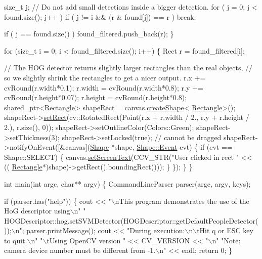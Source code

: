 \begin{DoxyCode}
        \textcolor{keywordtype}{size\_t} j;
        \textcolor{comment}{// Do not add small detections inside a bigger detection.}
        \textcolor{keywordflow}{for} ( j = 0; j < found.size(); j++ )
            \textcolor{keywordflow}{if} ( j != i && (r & found[j]) == r )
                \textcolor{keywordflow}{break};

        \textcolor{keywordflow}{if} ( j == found.size() )
            found\_filtered.push\_back(r);
    \}

    \textcolor{keywordflow}{for} (\textcolor{keywordtype}{size\_t} i = 0; i < found\_filtered.size(); i++)
    \{
        Rect r = found\_filtered[i];

        \textcolor{comment}{// The HOG detector returns slightly larger rectangles than the real objects,}
        \textcolor{comment}{// so we slightly shrink the rectangles to get a nicer output.}
        r.x += cvRound(r.width*0.1);
        r.width = cvRound(r.width*0.8);
        r.y += cvRound(r.height*0.07);
        r.height = cvRound(r.height*0.8);
        shared\_ptr<Rectangle> shapeRect = canvas.\hyperlink{classcanvascv_1_1Canvas_a630ac92458f1718d0c597e96dd5a4aef}{createShape}<
      \hyperlink{classcanvascv_1_1Rectangle}{Rectangle}>();
        shapeRect->\hyperlink{classcanvascv_1_1Rectangle_a5149d50c87c3388619ace3badd868f50}{setRect}(cv::RotatedRect(Point(r.x + r.width / 2., r.y + r.height / 2.), r.size(),
       0));
        shapeRect->setOutlineColor(Colors::Green);
        shapeRect->setThickness(3);
        shapeRect->setLocked(\textcolor{keyword}{true}); \textcolor{comment}{// cannot be dragged}
        shapeRect->notifyOnEvent([&canvas](\hyperlink{classcanvascv_1_1Shape}{Shape} *shape, \hyperlink{classcanvascv_1_1Shape_a3fa381d7be3c6bb3cd736e237a444d5c}{Shape::Event} evt)
        \{
            \textcolor{keywordflow}{if} (evt == Shape::SELECT)
            \{
                canvas.\hyperlink{classcanvascv_1_1Canvas_aaedea276b82a8a4cfc0895ae81113cfd}{setScreenText}(CCV\_STR(\textcolor{stringliteral}{"User clicked in rect "} << ((
      \hyperlink{classcanvascv_1_1Rectangle}{Rectangle}*)shape)->getRect().boundingRect()));
            \}
        \});
    \}
\}

\textcolor{keywordtype}{int} main(\textcolor{keywordtype}{int} argc, \textcolor{keywordtype}{char}** argv)
\{
    CommandLineParser parser(argc, argv, keys);

    \textcolor{keywordflow}{if} (parser.has(\textcolor{stringliteral}{"help"}))
    \{
        cout << \textcolor{stringliteral}{"\(\backslash\)nThis program demonstrates the use of the HoG descriptor using\(\backslash\)n"}
            \textcolor{stringliteral}{" HOGDescriptor::hog.setSVMDetector(HOGDescriptor::getDefaultPeopleDetector());\(\backslash\)n"};
        parser.printMessage();
        cout << \textcolor{stringliteral}{"During execution:\(\backslash\)n\(\backslash\)tHit q or ESC key to quit.\(\backslash\)n"}
            \textcolor{stringliteral}{"\(\backslash\)tUsing OpenCV version "} << CV\_VERSION << \textcolor{stringliteral}{"\(\backslash\)n"}
            \textcolor{stringliteral}{"Note: camera device number must be different from -1.\(\backslash\)n"} << endl;
        \textcolor{keywordflow}{return} 0;
    \}


\end{DoxyCode}
